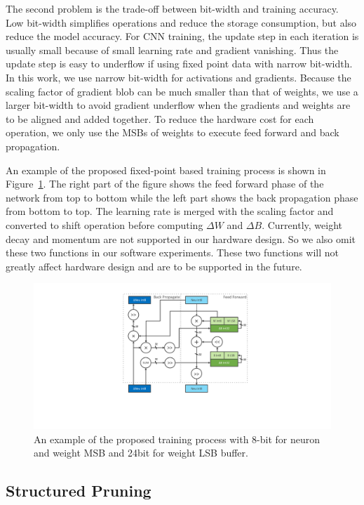The second problem is the trade-off between bit-width and training accuracy. Low bit-width simplifies operations and reduce the storage consumption, but also reduce the model accuracy. For CNN training, the update step in each iteration is usually small because of small learning rate and gradient vanishing. Thus the update step is easy to underflow if using fixed point data with narrow bit-width.  In this work, we use narrow bit-width for activations and gradients. Because the scaling factor of gradient blob can be much smaller than that of weights, we use a larger bit-width to avoid gradient underflow when the gradients and weights are to be aligned and added together. To reduce the hardware cost for each operation, we only use the MSBs of weights to execute feed forward and back propagation.

An example of the proposed fixed-point based training process is shown in Figure~\ref{fig:train_fixed}. The right part of the figure shows the feed forward phase of the network from top to bottom while the left part shows the back propagation phase from bottom to top. The learning rate is merged with the scaling factor and converted to shift operation before computing $\Delta W$ and $\Delta B$. Currently, weight decay and momentum are not supported in our hardware design. So we also omit these two functions in our software experiments. These two functions will not greatly affect hardware design and are to be supported in the future.

\begin{figure}[tb]
  \centering 
  \includegraphics[width=1.0\columnwidth]{figures/train_fixed.pdf}
  \caption{An example of the proposed training process with 8-bit for neuron and weight MSB and 24bit for weight LSB buffer. }
  \label{fig:train_fixed}
\end{figure}

\subsection{Structured Pruning}

